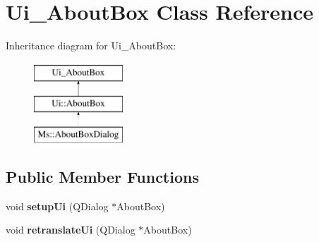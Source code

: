 \hypertarget{class_ui___about_box}{}\section{Ui\+\_\+\+About\+Box Class Reference}
\label{class_ui___about_box}
Inheritance diagram for Ui\+\_\+\+About\+Box\+:\begin{figure}[H]
\begin{center}
\leavevmode
\includegraphics[height=3.000000cm]{class_ui___about_box}
\end{center}
\end{figure}
\subsection*{Public Member Functions}
\begin{DoxyCompactItemize}
\item 
\mbox{\label{class_ui___about_box_ad7fa96720dff1a3ed0a6e9c49c10ae9d}} 
void {\bfseries setup\+Ui} (Q\+Dialog $\ast$About\+Box)
\item 
\mbox{\label{class_ui___about_box_a9a226e21de540a547e1c7a7243abf566}} 
void {\bfseries retranslate\+Ui} (Q\+Dialog $\ast$About\+Box)
\end{DoxyCompactItemize}
